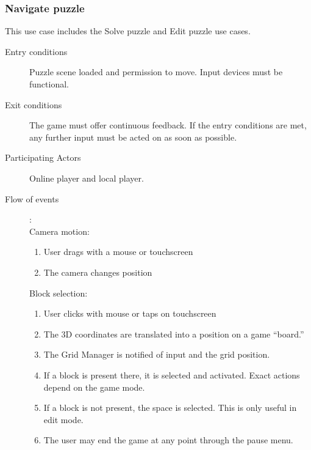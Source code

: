 \documentclass[12pt]{article}
\begin{document}
\begin{mdframed}
    \subsubsection{Navigate puzzle}
    This use case includes the Solve puzzle and Edit puzzle use cases.
    \begin{description}
        \item[Entry conditions] Puzzle scene loaded and permission to move.
            Input devices must be functional.
        \item[Exit conditions] The game must offer continuous feedback.
            If the entry conditions are met, any further input must be
            acted on as soon as possible.
        \item[Participating Actors] Online player and local player.
        \item[Flow of events]:
        	\\
            Camera motion:
            \begin{enumerate}
                \item User drags with a mouse or touchscreen
                \item The camera changes position
            \end{enumerate}

            Block selection:
            \begin{enumerate}
                \item User clicks with mouse or taps on touchscreen
                \item The 3D coordinates are translated into a position on
                    a game ``board.''
                \item The Grid Manager is notified of input and the grid
                    position.
                \item If a block is present there, it is selected and activated.
                    Exact actions depend on the game mode.
                \item If a block is not present, the space is selected. This
                    is only useful in edit mode.
                \item The user may end the game at any point through the pause
                    menu.
            \end{enumerate}

    \end{description}
\end{mdframed}
\end{document}
